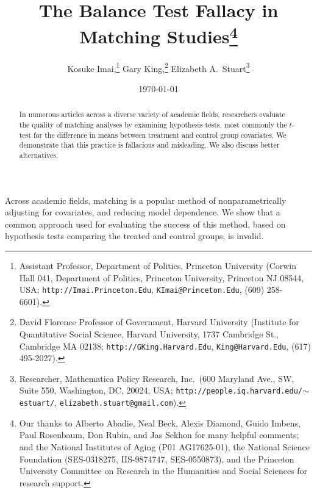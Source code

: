 \documentclass[11pt,titlepage]{article}
\title{The Balance Test Fallacy in Matching Studies\thanks{Our thanks
    to Alberto Abadie, Neal Beck, Alexis Diamond, Guido Imbens, Paul
    Rosenbaum, Don Rubin, and Jas Sekhon for many helpful comments;
    and the National Institutes of Aging (P01 AG17625-01), the
    National Science Foundation (SES-0318275, IIS-9874747,
    SES-0550873), and the Princeton University Committee on Research
    in the Humanities and Social Sciences for research support.}}
\author{Kosuke Imai,\thanks{Assistant Professor, Department of
    Politics, Princeton University (Corwin Hall 041, Department of
    Politics, Princeton University, Princeton NJ 08544, USA;
    \texttt{http://Imai.Princeton.Edu}, \texttt{KImai@Princeton.Edu},
    (609) 258-6601).}
  Gary King,\thanks{David Florence Professor of Government, Harvard
    University (Institute for Quantitative Social Science, Harvard
    University, 1737 Cambridge St., Cambridge MA 02138;
    \texttt{http://GKing.Harvard.Edu}, \texttt{King@Harvard.Edu},
    (617) 495-2027).}
  Elizabeth A.\ Stuart\thanks{Researcher, Mathematica Policy Research,
    Inc.\, (600 Maryland Ave., SW, Suite 550, Washington, DC, 20024,
    USA; \texttt{http://people.iq.harvard.edu/$\sim$estuart/},
    \texttt{elizabeth.stuart@gmail.com}).}}
\date{\today}
\begin{document}
\maketitle

\begin{abstract}
  In numerous articles across a diverse variety of academic fields,
  researchers evaluate the quality of matching analyses by examining
  hypothesis tests, most commonly the $t$-test for the difference in
  means between treatment and control group covariates.  We
  demonstrate that this practice is fallacious and misleading.  We
  also discuss better alternatives.
\end{abstract}

Across academic fields, matching is a popular method of
nonparametrically adjusting for covariates, and reducing model
dependence.  We show that a common approach used for evaluating the
success of this method, based on hypothesis tests comparing the
treated and control groups, is invalid.
\end{document}
